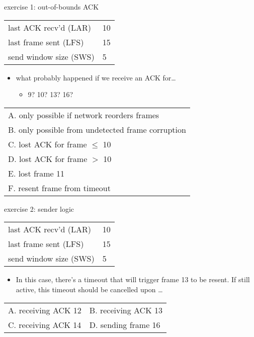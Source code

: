 \begin{frame}{exercise 1: out-of-bounds ACK}
\begin{tabular}{l|l}
last ACK recv'd (LAR) & 10 \\
last frame sent (LFS) & 15 \\
send window size (SWS) & 5 \\
\end{tabular}
\begin{itemize}
\item what probably happened if we receive an ACK for\ldots
    \begin{itemize}
    \item 9? 10? 13? 16?
    \end{itemize}
\end{itemize}
\begin{tabular}{l}
A. only possible if network reorders frames \\
B. only possible from undetected frame corruption \\
C. lost ACK for frame $\le$ 10\\
D. lost ACK for frame $>$ 10\\
E. lost frame 11 \\
F. resent frame from timeout \\
\end{tabular}
\end{frame}

\begin{frame}{exercise 2: sender logic}
\begin{tabular}{l|l}
last ACK recv'd (LAR) & 10 \\
last frame sent (LFS) & 15 \\
send window size (SWS) & 5 \\
\end{tabular}
\begin{itemize}
\item In this case, there's a timeout that will
trigger frame 13 to be resent. If still active,
this timeout should be cancelled upon \ldots
\end{itemize}
\begin{tabular}{ll}
A. receiving ACK 12 & B. receiving ACK 13 \\
C. receiving ACK 14 & D. sending frame 16 \\
\end{tabular}
\end{frame}

